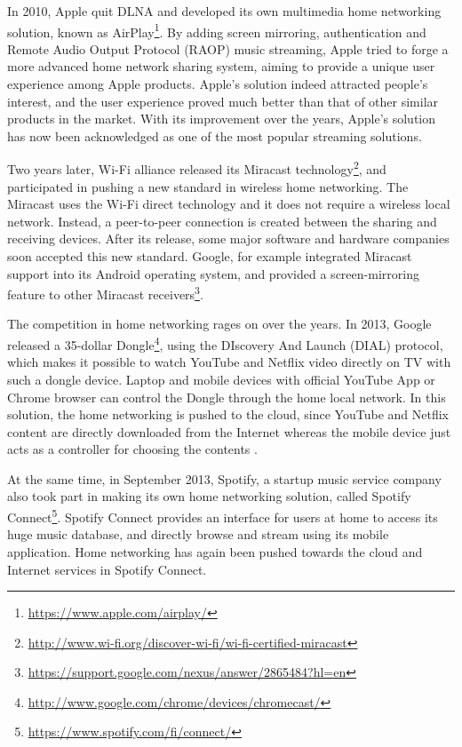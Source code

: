 In 2010, Apple quit DLNA and developed its own multimedia home networking 
solution, known as AirPlay\footnote{\url{https://www.apple.com/airplay/}}. By
adding screen mirroring, authentication and Remote Audio Output Protocol (RAOP)
music streaming, Apple tried to forge a more advanced home network sharing
system, aiming to provide a unique user experience among Apple products.
Apple's solution indeed attracted people's interest, and the user experience
proved much better than that of other similar products in the market. With its
improvement over the years,  Apple's solution has now been acknowledged as one
of the most popular streaming solutions.

Two years later, Wi-Fi alliance released its Miracast
technology\footnote{\url{http://www.wi-fi.org/discover-wi-fi/wi-fi-certified-miracast}},
and participated in pushing a new standard in wireless home networking. The
Miracast uses the Wi-Fi direct technology \cite{miracast_consumer} and it does
not require a wireless local network. Instead, a peer-to-peer connection is
created between the sharing and receiving devices. After its release, some
major software and hardware companies soon accepted this new standard. Google,
for example integrated Miracast support into its Android operating system, and
provided a screen-mirroring feature to other Miracast
receivers\footnote{\url{https://support.google.com/nexus/answer/2865484?hl=en}}.

The competition in home networking rages on over the years. In 2013, Google
released a 35-dollar
Dongle\footnote{\url{http://www.google.com/chrome/devices/chromecast/}}, using
the DIscovery And Launch (DIAL) protocol, which makes it possible to watch
YouTube and Netflix video directly on TV with such a dongle device. Laptop and mobile devices with
official YouTube App or Chrome browser can control the Dongle through the home
local network. In this solution, the home networking is pushed to the cloud,
since YouTube and Netflix content are directly downloaded from the Internet
whereas the mobile device just acts as a controller for choosing the
contents \cite{dial}.

At the same time, in September 2013, Spotify, a startup music service 
company also took part in making its own home networking solution, called 
Spotify Connect\footnote{\url{https://www.spotify.com/fi/connect/}}. Spotify
Connect provides an interface for users at home to access its huge music database, and directly browse and stream
using its mobile application. Home networking has again been pushed towards the
cloud and Internet services in Spotify Connect.

